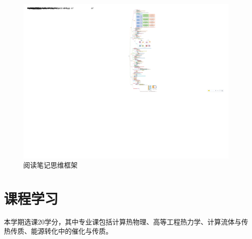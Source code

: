 \documentclass[oneside]{report}
\begin{document}
\begin{figure}[H]
    \centering
    \includegraphics[height=\textheight]{image/Markmap.pdf}
    \caption{阅读笔记思维框架}
    \label{fig:笔记}
\end{figure}

\section*{课程学习}

本学期选课20学分，其中专业课包括计算热物理、高等工程热力学、计算流体与传热传质、能源转化中的催化与传质。
\end{document}

